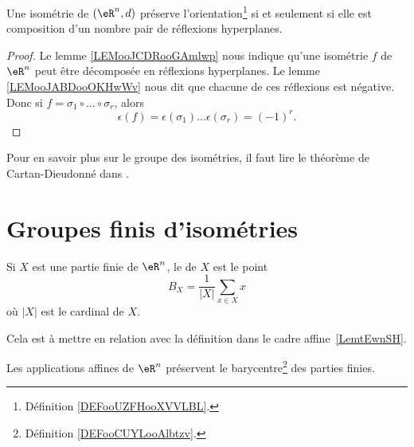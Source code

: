 \begin{theorem}      \label{THOooQEWRooYeOIfZ}
    Une isométrie de \( (\eR^n,d)\) préserve l'orientation\footnote{Définition \ref{DEFooUZFHooXVVLBL}.} si et seulement si elle est composition d'un nombre pair de réflexions hyperplanes.
\end{theorem}

\begin{proof}
    Le lemme \ref{LEMooJCDRooGAmlwp} nous indique qu'une isométrie \( f\) de \( \eR^n\) peut être décomposée en réflexions hyperplanes. Le lemme \ref{LEMooJABDooOKHwWv} nous dit que chacune de ces réflexions est négative. Donc si \( f=\sigma_1\circ\ldots\circ \sigma_r\), alors
    \begin{equation}
        \epsilon(f)=\epsilon(\sigma_1)\ldots \epsilon(\sigma_r)=(-1)^r.
    \end{equation}
\end{proof}

Pour en savoir plus sur le groupe des isométries, il faut lire le théorème de Cartan-Dieudonné dans \cite{JGAdTA}.

\section{Groupes finis d'isométries}

\begin{definition}      \label{DEFooCUYLooAlbtzv}
	Si \( X\) est une partie finie de \( \eR^n\), le  de \( X\) est le point
	\begin{equation}
		B_X=\frac{1}{ | X | }\sum_{x\in X}x
	\end{equation}
	où \( | X |\) est le cardinal de \( X\).
\end{definition}
Cela est à mettre en relation avec la définition dans le cadre affine~\ref{LemtEwnSH}.

\begin{lemma}        \label{LEMooSEZYooYceLIb}
	Les applications affines de \( \eR^n\) préservent le barycentre\footnote{Définition \ref{DEFooCUYLooAlbtzv}.} des parties finies.
\end{lemma}

